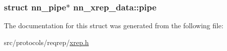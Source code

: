\subsubsection[{pipe}]{\setlength{\rightskip}{0pt plus 5cm}struct nn\+\_\+pipe$\ast$ nn\+\_\+xrep\+\_\+data\+::pipe}\hypertarget{structnn__xrep__data_ab3cd33d77a367f2527da944c9aaeb577}{}\label{structnn__xrep__data_ab3cd33d77a367f2527da944c9aaeb577}


The documentation for this struct was generated from the following file\+:\begin{DoxyCompactItemize}
\item 
src/protocols/reqrep/\hyperlink{xrep_8h}{xrep.\+h}\end{DoxyCompactItemize}
